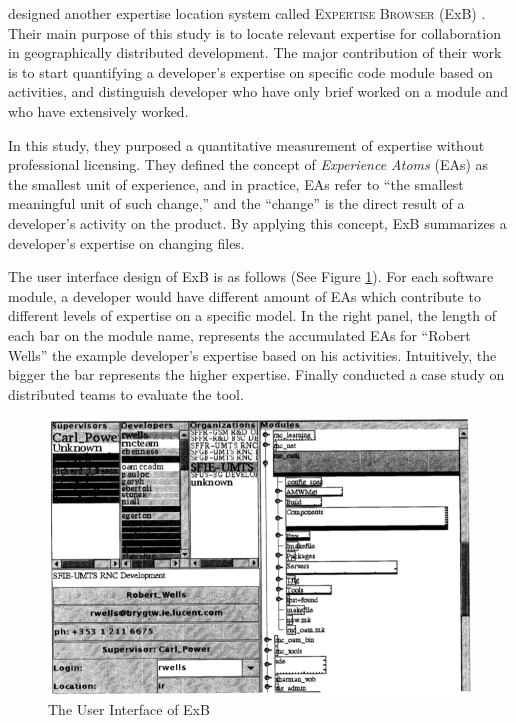 \textbf{\citeauthor{mockus2002expertise} \citeyear{mockus2002expertise}}

\citeauthor{mockus2002expertise} designed another expertise location system called \textsc{Expertise Browser} (ExB) \cite{mockus2002expertise}. Their main purpose of this study is to locate relevant expertise for collaboration in geographically distributed development. The major contribution of their work is to start quantifying a developer's expertise on specific code module based on activities, and distinguish developer who have only brief worked on a module and who have extensively worked.

In this study, they purposed a quantitative measurement of expertise without professional licensing. They defined the concept of \textit{Experience Atoms} (EAs) as the smallest unit of experience, and in practice, EAs refer to ``the smallest meaningful unit of such change,'' and the ``change'' is the direct result of a developer's activity on the product. By applying this concept, ExB summarizes a developer's expertise on changing files.

The user interface design of ExB is as follows (See Figure \ref{ExB}). For each software module, a developer would have different amount of EAs which contribute to different levels of expertise on a specific model. In the right panel, the length of each bar on the module name, represents the accumulated EAs for ``Robert Wells'' the example developer's expertise based on his activities. Intuitively, the bigger the bar represents the higher expertise. Finally \citeauthor{mockus2002expertise} conducted a case study on distributed teams to evaluate the tool.

\begin{figure}
\includegraphics[width = 0.8\columnwidth]{ExB.png}
\centering
\caption{The User Interface of ExB \cite{mockus2002expertise}}
\label{ExB}
\end{figure}

